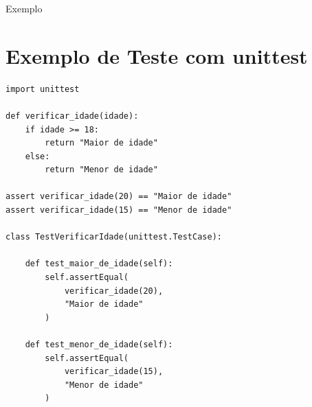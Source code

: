 
\begin{frame}[fragile]{Exemplo}
    \section*{Exemplo de Teste com unittest}

\begin{lstlisting}[float,caption={Código Python},label={lst:python}]
import unittest

def verificar_idade(idade):
    if idade >= 18:
        return "Maior de idade"
    else:
        return "Menor de idade"

assert verificar_idade(20) == "Maior de idade"
assert verificar_idade(15) == "Menor de idade"

class TestVerificarIdade(unittest.TestCase):

    def test_maior_de_idade(self):
        self.assertEqual(
            verificar_idade(20),
            "Maior de idade"
        )

    def test_menor_de_idade(self):
        self.assertEqual(
            verificar_idade(15),
            "Menor de idade"
        )
\end{lstlisting}

\end{frame}
